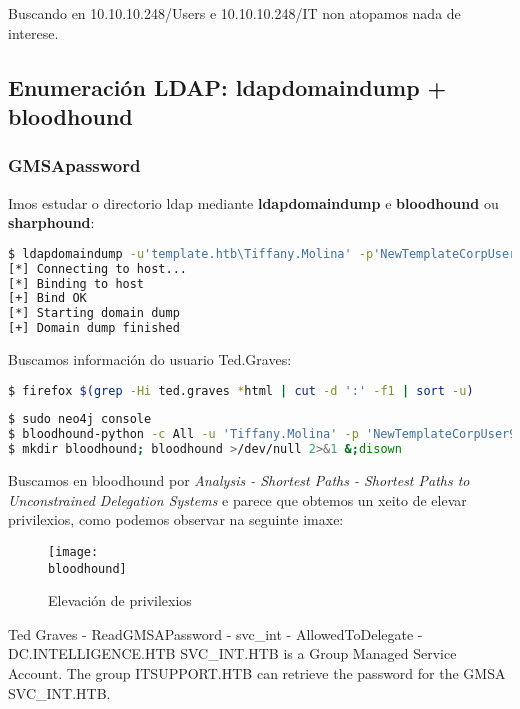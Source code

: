 \documentclass[a4paper]{article}
\newcommand{\bloodhound}{graph-bloodhound-elevation-privilege.png}
\newcommand{\ipTarget}{10.10.10.248}
\begin{document}
Buscando en 10.10.10.248/Users e 10.10.10.248/IT non atopamos nada de interese.

\subsection{Enumeración LDAP: ldapdomaindump + bloodhound}
\subsubsection{GMSApassword}
Imos estudar o directorio ldap mediante \textbf{ldapdomaindump} e \textbf{bloodhound} ou \textbf{sharphound}:
        \begin{lstlisting}[language=Bash, caption=ldapdomaindump]
$ ldapdomaindump -u'template.htb\Tiffany.Molina' -p'NewTemplateCorpUser9876' 10.10.10.248
[*] Connecting to host...
[*] Binding to host
[+] Bind OK
[*] Starting domain dump
[+] Domain dump finished\end{lstlisting}             

Buscamos información do usuario Ted.Graves:
        \begin{lstlisting}[language=Bash, caption=Información sobre o usuario Ted.Graves]
$ firefox $(grep -Hi ted.graves *html | cut -d ':' -f1 | sort -u)\end{lstlisting}

        \begin{lstlisting}[language=Bash, caption=bloodhound, linewidth=17.8cm]
$ sudo neo4j console
$ bloodhound-python -c All -u 'Tiffany.Molina' -p 'NewTemplateCorpUser9876' -ns ¬\ipTarget¬ -d template.htb
$ mkdir bloodhound; bloodhound >/dev/null 2>&1 &;disown
\end{lstlisting}

Buscamos en bloodhound por \emph{Analysis - Shortest Paths - Shortest Paths to Unconstrained Delegation Systems} e parece que obtemos un xeito de elevar privilexios, como podemos observar na seguinte imaxe: 
        \begin{figure}[h]
                \centering
                \texttt{[image: \\bloodhound]}
                \caption{Elevación de privilexios}
        \end{figure}


        \begin{tcolorbox}[colback=green!5!white,colframe=green!75!black]
Ted Graves - ReadGMSAPassword - svc\_int - AllowedToDelegate - DC.INTELLIGENCE.HTB
SVC\_INT\@INTELLIGENCE.HTB is a Group Managed Service Account. The group ITSUPPORT\@INTELLIGENCE.HTB can retrieve the password for the GMSA SVC\_INT\@INTELLIGENCE.HTB.\end{tcolorbox}
\end{document}
